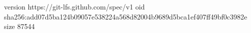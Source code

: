 version https://git-lfs.github.com/spec/v1
oid sha256:add07d5ba124b09057e538224a568d82004b9689d5bca1ef407ff49bf0c3982e
size 87544
